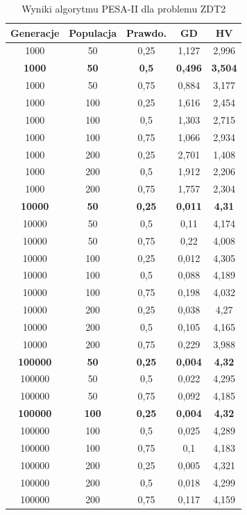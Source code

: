 \documentclass{classrep}
\begin{document}
\begin{table}[H]
\centering
\caption{Wyniki algorytmu PESA-II dla problemu ZDT2}
\label{tab:PESAII_ZDT2}
\begin{tabular}{|ccc|c|c|}
\hline
\textbf{Generacje} & \textbf{Populacja} & \textbf{Prawdo.} & \textbf{GD} & \textbf{HV} \\ \hline
1000 & 50 & 0,25 & 1,127 & 2,996 \\ \hline
\textbf{1000} & \textbf{50} & \textbf{0,5} & \textbf{0,496} & \textbf{3,504} \\ \hline
1000 & 50 & 0,75 & 0,884 & 3,177 \\ \hline
1000 & 100 & 0,25 & 1,616 & 2,454 \\ \hline
1000 & 100 & 0,5 & 1,303 & 2,715 \\ \hline
1000 & 100 & 0,75 & 1,066 & 2,934 \\ \hline
1000 & 200 & 0,25 & 2,701 & 1,408 \\ \hline
1000 & 200 & 0,5 & 1,912 & 2,206 \\ \hline
1000 & 200 & 0,75 & 1,757 & 2,304 \\ \hline
\textbf{10000} & \textbf{50} & \textbf{0,25} & \textbf{0,011} & \textbf{4,31} \\ \hline
10000 & 50 & 0,5 & 0,11 & 4,174 \\ \hline
10000 & 50 & 0,75 & 0,22 & 4,008 \\ \hline
10000 & 100 & 0,25 & 0,012 & 4,305 \\ \hline
10000 & 100 & 0,5 & 0,088 & 4,189 \\ \hline
10000 & 100 & 0,75 & 0,198 & 4,032 \\ \hline
10000 & 200 & 0,25 & 0,038 & 4,27 \\ \hline
10000 & 200 & 0,5 & 0,105 & 4,165 \\ \hline
10000 & 200 & 0,75 & 0,229 & 3,988 \\ \hline
\textbf{100000} & \textbf{50} & \textbf{0,25} & \textbf{0,004} & \textbf{4,32} \\ \hline
100000 & 50 & 0,5 & 0,022 & 4,295 \\ \hline
100000 & 50 & 0,75 & 0,092 & 4,185 \\ \hline
\textbf{100000} & \textbf{100} & \textbf{0,25} & \textbf{0,004} & \textbf{4,32} \\ \hline
100000 & 100 & 0,5 & 0,025 & 4,289 \\ \hline
100000 & 100 & 0,75 & 0,1 & 4,183 \\ \hline
100000 & 200 & 0,25 & 0,005 & 4,321 \\ \hline
100000 & 200 & 0,5 & 0,018 & 4,299 \\ \hline
100000 & 200 & 0,75 & 0,117 & 4,159 \\ \hline
\end{tabular}
\end{table}
\end{document}
